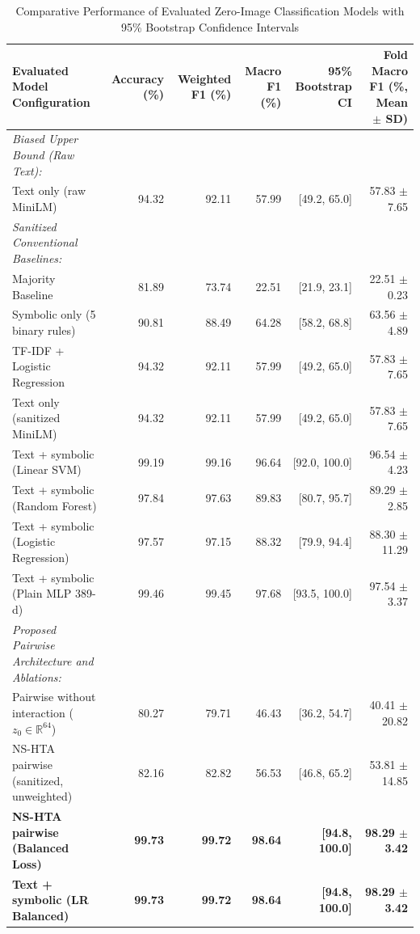 \documentclass[conference]{IEEEtran}
\begin{document}
\begin{table}[t]
\caption{Comparative Performance of Evaluated Zero-Image Classification Models with 95\% Bootstrap Confidence Intervals}
\label{tab:results}
\centering
\begin{tabular}{lrrrrr}
\toprule
\textbf{Evaluated Model Configuration} & \textbf{Accuracy (\%)} & \textbf{Weighted F1 (\%)} & \textbf{Macro F1 (\%)} & \textbf{95\% Bootstrap CI} & \textbf{Fold Macro F1 (\%, Mean $\pm$ SD)} \\
\midrule
\textit{Biased Upper Bound (Raw Text):} & & & & & \\
Text only (raw MiniLM) & 94.32 & 92.11 & 57.99 & [49.2, 65.0] & 57.83 $\pm$ 7.65 \\
\midrule
\textit{Sanitized Conventional Baselines:} & & & & & \\
Majority Baseline & 81.89 & 73.74 & 22.51 & [21.9, 23.1] & 22.51 $\pm$ 0.23 \\
Symbolic only (5 binary rules) & 90.81 & 88.49 & 64.28 & [58.2, 68.8] & 63.56 $\pm$ 4.89 \\
TF-IDF + Logistic Regression & 94.32 & 92.11 & 57.99 & [49.2, 65.0] & 57.83 $\pm$ 7.65 \\
Text only (sanitized MiniLM) & 94.32 & 92.11 & 57.99 & [49.2, 65.0] & 57.83 $\pm$ 7.65 \\
Text + symbolic (Linear SVM) & 99.19 & 99.16 & 96.64 & [92.0, 100.0] & 96.54 $\pm$ 4.23 \\
Text + symbolic (Random Forest) & 97.84 & 97.63 & 89.83 & [80.7, 95.7] & 89.29 $\pm$ 2.85 \\
Text + symbolic (Logistic Regression) & 97.57 & 97.15 & 88.32 & [79.9, 94.4] & 88.30 $\pm$ 11.29 \\
Text + symbolic (Plain MLP 389-d) & 99.46 & 99.45 & 97.68 & [93.5, 100.0] & 97.54 $\pm$ 3.37 \\
\midrule
\textit{Proposed Pairwise Architecture and Ablations:} & & & & & \\
Pairwise without interaction ($z_0 \in \mathbb{R}^{64}$) & 80.27 & 79.71 & 46.43 & [36.2, 54.7] & 40.41 $\pm$ 20.82 \\
NS-HTA pairwise (sanitized, unweighted) & 82.16 & 82.82 & 56.53 & [46.8, 65.2] & 53.81 $\pm$ 14.85 \\
\textbf{NS-HTA pairwise (Balanced Loss)} & \textbf{99.73} & \textbf{99.72} & \textbf{98.64} & \textbf{[94.8, 100.0]} & \textbf{98.29 $\pm$ 3.42} \\
\textbf{Text + symbolic (LR Balanced)} & \textbf{99.73} & \textbf{99.72} & \textbf{98.64} & \textbf{[94.8, 100.0]} & \textbf{98.29 $\pm$ 3.42} \\
\bottomrule
\end{tabular}
\end{table}
\end{document}
